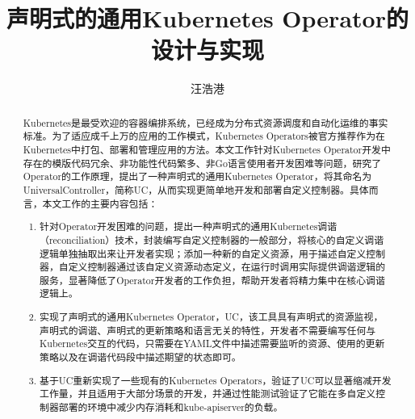 \documentclass[macfonts,master]{njuthesis}
\title{声明式的通用Kubernetes Operator的设计与实现}
\author{汪浩港}
\institute{南京大学}
\begin{document}

\maketitle
\makeenglishtitle


\frontmatter

\begin{abstract}
Kubernetes是最受欢迎的容器编排系统，已经成为分布式资源调度和自动化运维的事实标准。为了适应成千上万的应用的工作模式，Kubernetes Operators被官方推荐作为在Kubernetes中打包、部署和管理应用的方法。本文工作针对Kubernetes Operator开发中存在的模版代码冗余、非功能性代码繁多、非Go语言使用者开发困难等问题，研究了Operator的工作原理，提出了一种声明式的通用Kubernetes Operator，将其命名为UniversalController，简称UC，从而实现更简单地开发和部署自定义控制器。具体而言，本文工作的主要内容包括：
\begin{enumerate}
	\item 针对Operator开发困难的问题，提出一种声明式的通用Kubernetes调谐（reconciliation）技术，封装编写自定义控制器的一般部分，将核心的自定义调谐逻辑单独抽取出来让开发者实现；添加一种新的自定义资源，用于描述自定义控制器，自定义控制器通过该自定义资源动态定义，在运行时调用实际提供调谐逻辑的服务，显著降低了Operator开发者的工作负担，帮助开发者将精力集中在核心调谐逻辑上。
	\item 实现了声明式的通用Kubernetes Operator，UC，该工具具有声明式的资源监视，声明式的调谐、声明式的更新策略和语言无关的特性，开发者不需要编写任何与Kubernetes交互的代码，只需要在YAML文件中描述需要监听的资源、使用的更新策略以及在调谐代码段中描述期望的状态即可。
	\item 基于UC重新实现了一些现有的Kubernetes Operators，验证了UC可以显著缩减开发工作量，并且适用于大部分场景的开发，并通过性能测试验证了它能在多自定义控制器部署的环境中减少内存消耗和kube-apiserver的负载。
\end{enumerate}

\end{abstract}
\end{document}
